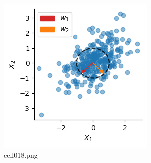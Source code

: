 \begin{figure}[ht]
	\centering
	\includegraphics[scale=0.8, max width=\linewidth]{./fig/local-learning-rule/pca-hebbian-learning/cell018.png}
	\caption{cell018.png}
	\label{cell018.png}
\end{figure}